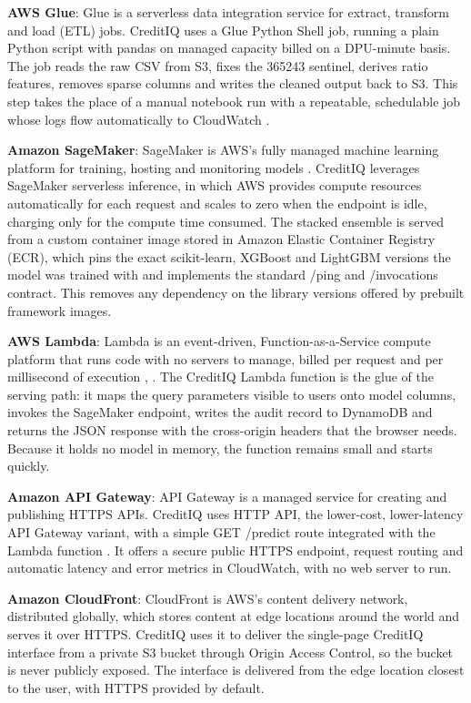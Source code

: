 \documentclass[conference]{IEEEtran}
\begin{document}
\textbf{AWS Glue}: Glue is a serverless data integration service for extract, transform and load (ETL) jobs. CreditIQ uses a Glue Python Shell job, running a plain Python script with pandas on managed capacity billed on a DPU-minute basis. The job reads the raw CSV from S3, fixes the 365243 sentinel, derives ratio features, removes sparse columns and writes the cleaned output back to S3. This step takes the place of a manual notebook run with a repeatable, schedulable job whose logs flow automatically to CloudWatch \cite{9}.

\textbf{Amazon SageMaker}: SageMaker is AWS's fully managed machine learning platform for training, hosting and monitoring models \cite{13}. CreditIQ leverages SageMaker serverless inference, in which AWS provides compute resources automatically for each request and scales to zero when the endpoint is idle, charging only for the compute time consumed. The stacked ensemble is served from a custom container image stored in Amazon Elastic Container Registry (ECR), which pins the exact scikit-learn, XGBoost and LightGBM versions the model was trained with and implements the standard /ping and /invocations contract. This removes any dependency on the library versions offered by prebuilt framework images.

\textbf{AWS Lambda}: Lambda is an event-driven, Function-as-a-Service compute platform that runs code with no servers to manage, billed per request and per millisecond of execution \cite{1}, \cite{7}. The CreditIQ Lambda function is the glue of the serving path: it maps the query parameters visible to users onto model columns, invokes the SageMaker endpoint, writes the audit record to DynamoDB and returns the JSON response with the cross-origin headers that the browser needs. Because it holds no model in memory, the function remains small and starts quickly.

\textbf{Amazon API Gateway}: API Gateway is a managed service for creating and publishing HTTPS APIs. CreditIQ uses HTTP API, the lower-cost, lower-latency API Gateway variant, with a simple GET /predict route integrated with the Lambda function \cite{10}. It offers a secure public HTTPS endpoint, request routing and automatic latency and error metrics in CloudWatch, with no web server to run.

\textbf{Amazon CloudFront}: CloudFront is AWS's content delivery network, distributed globally, which stores content at edge locations around the world and serves it over HTTPS. CreditIQ uses it to deliver the single-page CreditIQ interface from a private S3 bucket through Origin Access Control, so the bucket is never publicly exposed. The interface is delivered from the edge location closest to the user, with HTTPS provided by default.
\end{document}
